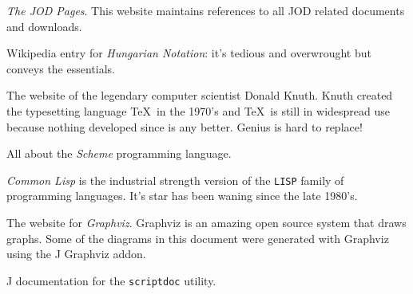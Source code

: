      
\begin{description}
                
\item  \emph{The JOD Pages}.  This website maintains references to all
JOD related documents and downloads.

                                 
\item Wikipedia entry for \emph{Hungarian Notation}:  it's tedious and overwrought
but conveys the essentials.

                       
\item The website of the legendary computer scientist Donald Knuth.  Knuth created
the typesetting language \TeX\ in the
1970's and \TeX\ is still in widespread use because nothing
developed since is any better.  Genius is hard to replace!

                            
\item All about the \emph{Scheme} programming language. 

                          
\item \emph{Common Lisp} is the industrial strength version of the \texttt{LISP}
family of programming languages.  It's star has been waning since
the late 1980's.  

                  
\item The  website for \emph{Graphviz}.  Graphviz is an amazing open source
system that draws graphs.  Some of the diagrams in this document were
generated with Graphviz using the J Graphviz addon.

                                               
\item J documentation for the \texttt{scriptdoc} utility.  

                      

\end{description}

